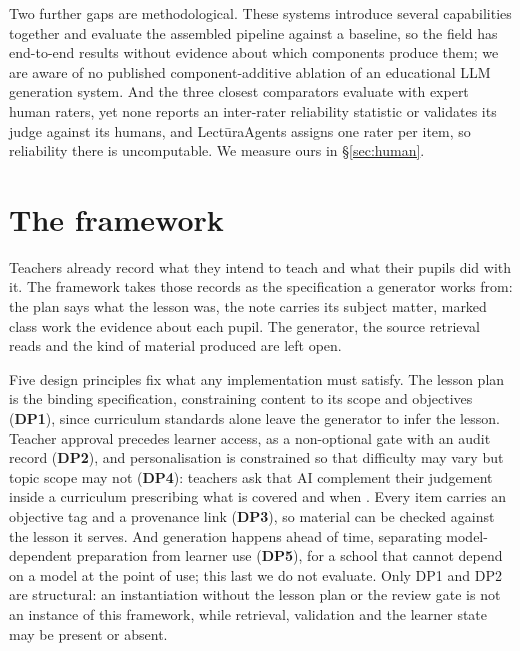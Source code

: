 \documentclass{article}
\begin{document}
Two further gaps are methodological. These systems introduce several capabilities together and
evaluate the assembled pipeline against a baseline, so the field has end-to-end results without
evidence about which components produce them; we are aware of no published component-additive
ablation of an educational LLM generation system. And the three closest comparators evaluate with
expert human raters, yet none reports an inter-rater reliability statistic or validates its judge against its
humans, and Lect\=uraAgents assigns one rater per item, so reliability there is uncomputable.
We measure ours in \S\ref{sec:human}.

\section{The framework}
\label{sec:framework}

Teachers already record what they intend to teach and what their pupils did with it. The
framework takes those records as the specification a generator works from: the plan says what
the lesson was, the note carries its subject matter, marked class work the evidence about each
pupil. The generator, the source retrieval reads and the kind of material produced are left
open.

Five design principles fix what any implementation must satisfy. The lesson plan is the binding
specification, constraining content to its scope and objectives (\textbf{DP1}), since curriculum
standards alone leave the generator to infer the lesson. Teacher
approval precedes learner access, as a non-optional gate with an audit record (\textbf{DP2}),
and personalisation is constrained so that difficulty may vary but topic scope may not
(\textbf{DP4}): teachers ask that AI complement their judgement \citep{seo2024} inside a
curriculum prescribing what is covered and when \citep{nikolaidis2024}. Every item carries an
objective tag and a provenance link (\textbf{DP3}), so material can be checked against the lesson it
serves. And generation happens ahead of time, separating model-dependent
preparation from learner use (\textbf{DP5}), for a school that cannot depend on a model at the
point of use; this last we do not evaluate. Only DP1 and DP2 are structural: an instantiation without the lesson plan or the review gate is
not an instance of this framework, while retrieval, validation and the learner state may be
present or absent.
\end{document}
